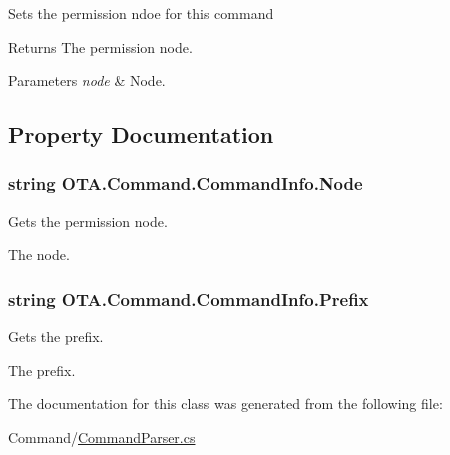 Sets the permission ndoe for this command 

\begin{DoxyReturn}{Returns}
The permission node.
\end{DoxyReturn}

\begin{DoxyParams}{Parameters}
{\em node} & Node.\\
\hline
\end{DoxyParams}


\subsection{Property Documentation}
\hypertarget{class_o_t_a_1_1_command_1_1_command_info_ae9537928af7e17583d46d8535c9743c9}{}
\subsubsection[{Node}]{\setlength{\rightskip}{0pt plus 5cm}string O\+T\+A.\+Command.\+Command\+Info.\+Node\hspace{0.3cm}{\ttfamily [get]}}\label{class_o_t_a_1_1_command_1_1_command_info_ae9537928af7e17583d46d8535c9743c9}


Gets the permission node. 

The node.\hypertarget{class_o_t_a_1_1_command_1_1_command_info_a7b0530400298e30d56643002dc27da4b}{}
\subsubsection[{Prefix}]{\setlength{\rightskip}{0pt plus 5cm}string O\+T\+A.\+Command.\+Command\+Info.\+Prefix\hspace{0.3cm}{\ttfamily [get]}}\label{class_o_t_a_1_1_command_1_1_command_info_a7b0530400298e30d56643002dc27da4b}


Gets the prefix. 

The prefix.

The documentation for this class was generated from the following file\+:\begin{DoxyCompactItemize}
\item 
Command/\hyperlink{_command_parser_8cs}{Command\+Parser.\+cs}\end{DoxyCompactItemize}
